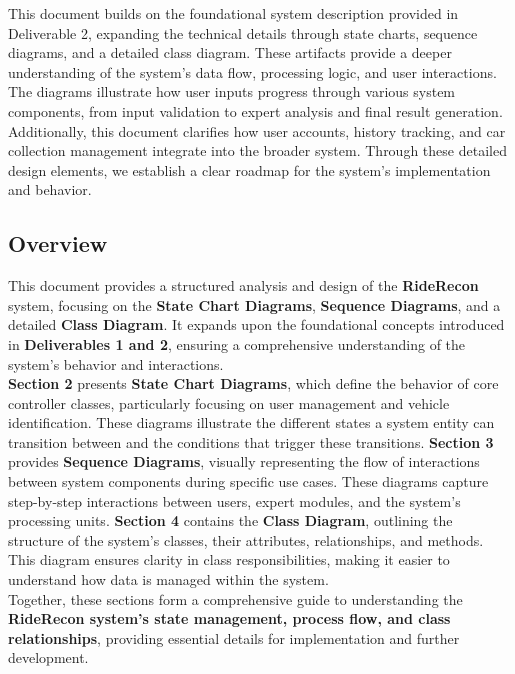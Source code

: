 \documentclass[]{article}
\begin{document}
\noindent This document builds on the foundational system description provided in Deliverable 2, expanding the technical details through state charts, sequence diagrams, and a detailed class diagram. These artifacts provide a deeper understanding of the system’s data flow, processing logic, and user interactions. The diagrams illustrate how user inputs progress through various system components, from input validation to expert analysis and final result generation. Additionally, this document clarifies how user accounts, history tracking, and car collection management integrate into the broader system. Through these detailed design elements, we establish a clear roadmap for the system’s implementation and behavior.


\subsection{Overview}
\label{sub:overview}
This document provides a structured analysis and design of the \textbf{RideRecon} system, focusing on the \textbf{State Chart Diagrams}, \textbf{Sequence Diagrams}, and a detailed \textbf{Class Diagram}. It expands upon the foundational concepts introduced in \textbf{Deliverables 1 and 2}, ensuring a comprehensive understanding of the system's behavior and interactions.\\
 
\noindent\textbf{Section 2} presents \textbf{State Chart Diagrams}, which define the behavior of core controller classes, particularly focusing on user management and vehicle identification. These diagrams illustrate the different states a system entity can transition between and the conditions that trigger these transitions. \textbf{Section 3} provides \textbf{Sequence Diagrams}, visually representing the flow of interactions between system components during specific use cases. These diagrams capture step-by-step interactions between users, expert modules, and the system’s processing units. \textbf{Section 4} contains the \textbf{Class Diagram}, outlining the structure of the system’s classes, their attributes, relationships, and methods. This diagram ensures clarity in class responsibilities, making it easier to understand how data is managed within the system.\\
 
\noindent Together, these sections form a comprehensive guide to understanding the \textbf{RideRecon system’s state management, process flow, and class relationships}, providing essential details for implementation and further development.
\end{document}
